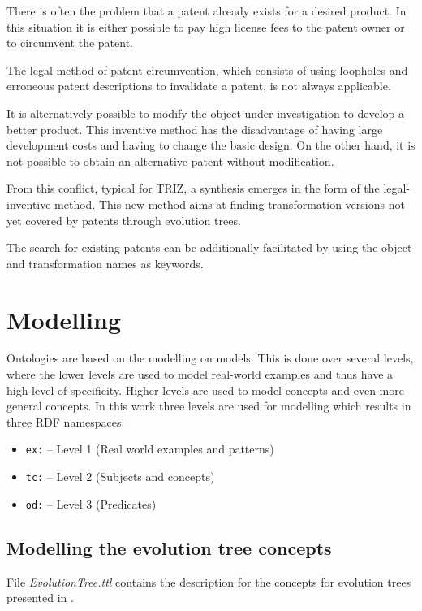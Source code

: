 \documentclass[11pt,a4paper]{article}
\begin{document}
There is often the problem that a patent already exists for a desired
product. In this situation it is either possible to pay high license fees to
the patent owner or to circumvent the patent.

The legal method of patent circumvention, which consists of using loopholes
and erroneous patent descriptions to invalidate a patent, is not always
applicable.

It is alternatively possible to modify the object under investigation to
develop a better product. This inventive method has the disadvantage of having
large development costs and having to change the basic design. On the other
hand, it is not possible to obtain an alternative patent without modification.

From this conflict, typical for TRIZ, a synthesis emerges in the form of the
legal-inventive method. This new method aims at finding transformation
versions not yet covered by patents through evolution trees.

The search for existing patents can be additionally facilitated by using the
object and transformation names as keywords.  

\section{Modelling}

Ontologies are based on the modelling on models. This is done over several
levels, where the lower levels are used to model real-world examples and thus
have a high level of specificity. Higher levels are used to model concepts and
even more general concepts. In this work three levels are used for modelling
which results in three RDF namespaces: 

\begin{itemize}[noitemsep]
\item \texttt{ex:} -- Level 1 (Real world examples and patterns)
\item \texttt{tc:} -- Level 2 (Subjects and concepts)
\item \texttt{od:} -- Level 3 (Predicates) 
\end{itemize}

\subsection{Modelling the evolution tree concepts}

File \textit{EvolutionTree.ttl} contains the description for the concepts for
evolution trees presented in \cite{Shpakovsky2016}.
\end{document}
